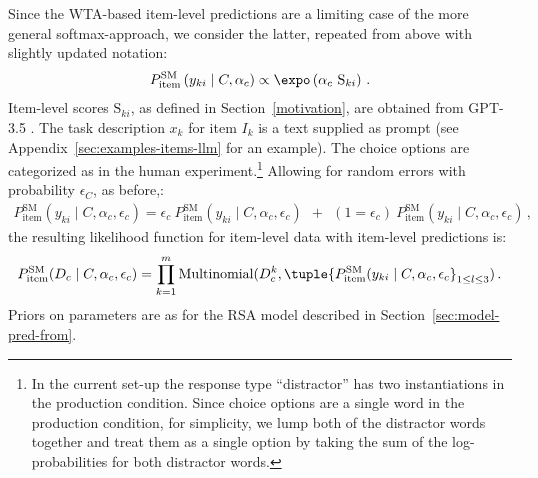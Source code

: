 \documentclass[fleqn]{article}
\begin{document}
Since the WTA-based item-level predictions are a limiting case of the more general softmax-approach, we consider the latter, repeated from above with slightly updated notation:
%
\begin{align*}
P_{\text{item}}^{\text{SM}}\left ( y_{ki} \mid C, \alpha_{c} \right ) \propto \expo \left (\alpha_{c} \ \text{S}_{ki} \right)\,.
\end{align*}
%
Item-level scores $\text{S}_{ki}$, as defined in Section~\ref{motivation}, are obtained from GPT-3.5 .
The task description $x_{k}$ for item $I_{k}$ is a text supplied as prompt (see Appendix~\ref{sec:examples-items-llm} for an example).
The choice options are categorized as in the human experiment.\footnote{
  In the current set-up the response type ``distractor'' has two instantiations in the production condition. Since choice options are a single word in the production condition, for simplicity, we lump both of the distractor words together and treat them as a single option by taking the sum of the log-probabilities for both distractor words.}
Allowing for random errors with probability $\epsilon_{C}$, as before,:
%
\begin{align*}
  P_{\text{item}}^{\text{SM}}\left ( y_{ki} \mid C, \alpha_{c}, \epsilon_{c} \right )
  = \epsilon_{c} \  P_{\text{item}}^{\text{SM}}\left ( y_{ki} \mid C, \alpha_{c}, \epsilon_{c} \right ) \ \ + \ \
  (1 = \epsilon_{c}) \  P_{\text{item}}^{\text{SM}}\left ( y_{ki} \mid C, \alpha_{c}, \epsilon_{c} \right )
  \,,
\end{align*}
%
the resulting likelihood function for item-level data with item-level predictions is:
%
\begin{align*}
 P^{\text{SM}}_{\text{item}}(D_{c} \mid C, \alpha_{c}, \epsilon_{c}) = \prod_{k = 1}^{m} \text{Multinomial}(D_{c}^{k}, \tuple{P^{\text{SM}}_{\text{item}}(y_{ki} \mid C,  \alpha_{c}, \epsilon_{c}}_{1 \le l \le 3})\,.
\end{align*}
%
Priors on parameters are as for the RSA model described in Section~\ref{sec:model-pred-from}.
\end{document}
